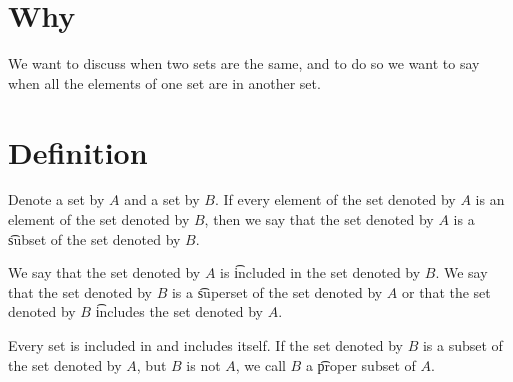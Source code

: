 

\section*{Why}

We want to discuss when two sets are the same, and to do so we want to say when all the elements of one set are in another set.

\section*{Definition}

Denote a set by $A$ and a set by $B$.
If every element of the set denoted by $A$ is an element of the set denoted by $B$, then we say that the set denoted by $A$ is a \t{subset} of the set denoted by $B$.

We say that the set denoted by $A$ is \t{included} in the set denoted by $B$.
We say that the set denoted by $B$ is a \t{superset} of the set denoted by $A$ or that the set denoted by $B$ \t{includes} the set denoted by $A$.

Every set is included in and includes itself.
If the set denoted by $B$ is a subset of the set denoted by $A$, but $B$ is not $A$, we call $B$ a \t{proper subset} of $A$.

